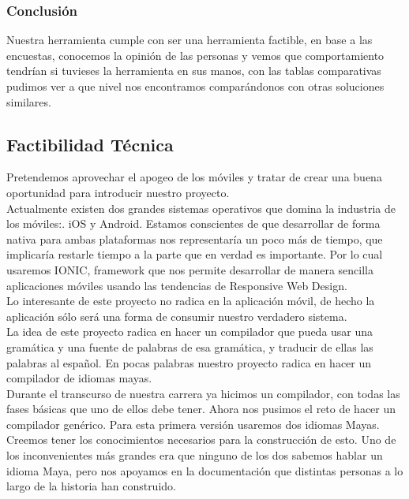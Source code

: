 \documentclass[a4paper,openright,11pt]{article}
\begin{document}
\subsubsection{Conclusión}
Nuestra herramienta cumple con ser una herramienta factible, en base a las encuestas, conocemos la opinión de las personas y vemos que comportamiento tendrían si tuvieses la herramienta en sus manos, con las tablas comparativas pudimos ver a que nivel nos encontramos comparándonos con otras soluciones similares.

\newpage
\subsection{Factibilidad T\'ecnica}
Pretendemos aprovechar el apogeo de los m\'oviles y tratar de crear una buena oportunidad para introducir nuestro proyecto.\\
Actualmente existen dos grandes sistemas operativos que domina la industria de los m\'oviles:. iOS y Android. Estamos conscientes de que desarrollar de forma nativa para ambas plataformas nos representar\'ia un poco m\'as de tiempo, que implicar\'ia restarle tiempo a la parte que en verdad es importante. Por lo cual usaremos IONIC, framework que nos permite desarrollar de manera sencilla aplicaciones m\'oviles usando las tendencias de Responsive Web Design. \\

Lo interesante de este proyecto no radica en la aplicaci\'on m\'ovil, de hecho la aplicaci\'on s\'olo ser\'a una forma de consumir nuestro verdadero sistema.\\

La idea de este proyecto radica en hacer un compilador que pueda usar una gram\'atica y una fuente de palabras de esa gram\'atica, y traducir de ellas las palabras al español. En pocas palabras nuestro proyecto radica en hacer un compilador de idiomas mayas.\\

Durante el transcurso de nuestra carrera ya hicimos un compilador, con todas las fases b\'asicas que uno de ellos debe tener. Ahora nos pusimos el reto de hacer un compilador gen\'erico. Para esta primera versi\'on usaremos dos idiomas Mayas.\\

Creemos tener los conocimientos necesarios para la construcci\'on de esto. Uno de los inconvenientes m\'as grandes era que ninguno de los dos sabemos hablar un idioma Maya, pero nos apoyamos en la documentaci\'on que distintas personas a lo largo de la historia han construido.\\ 
\end{document}
